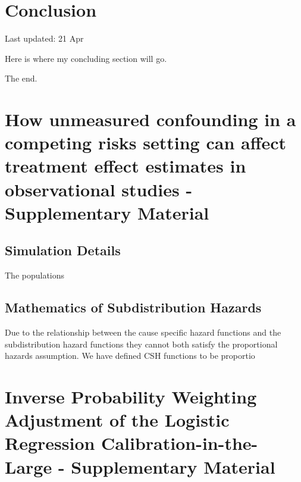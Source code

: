 \documentclass[12pt,PhD,twoside,openright]{muthesis}
\begin{document}
\hypertarget{chap-conclusion}{%
\chapter{Conclusion}\label{chap-conclusion}}


Last updated: 21 Apr

Here is where my concluding section will go.

The end.

\hypertarget{appendix-appendices}{%
\appendix}


\hypertarget{chap-Conf-CR-supp}{%
\chapter{How unmeasured confounding in a competing risks setting can affect treatment effect estimates in observational studies - Supplementary Material}\label{chap-Conf-CR-supp}}


\hypertarget{simulation-details}{%
\section{Simulation Details}\label{simulation-details}}

The populations

\hypertarget{mathematics-of-subdistribution-hazards}{%
\section{Mathematics of Subdistribution Hazards}\label{mathematics-of-subdistribution-hazards}}

Due to the relationship between the cause specific hazard functions and the subdistribution hazard functions they cannot both satisfy the proportional hazards assumption. We have defined CSH functions to be proportio

\hypertarget{chap-IPCW-logistic-supp}{%
\chapter{Inverse Probability Weighting Adjustment of the Logistic Regression Calibration-in-the-Large - Supplementary Material}\label{chap-IPCW-logistic-supp}}

\end{document}
